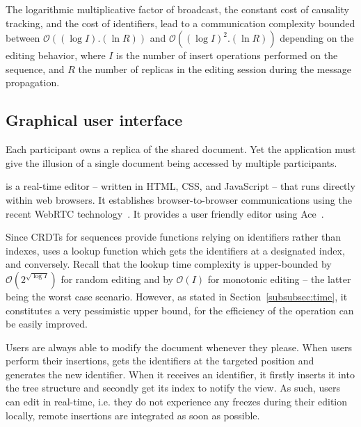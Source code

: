 The logarithmic multiplicative factor of broadcast, the constant cost of
causality tracking, and the cost of identifiers, lead to a communication
complexity bounded between $\mathcal{O}((\log I).(\ln R))$ and
$\mathcal{O}((\log I)^2.(\ln R))$ depending on the editing behavior, where $I$
is the number of insert operations performed on the sequence, and $R$ the number
of replicas in the editing session during the message propagation.

\subsection{Graphical user interface}

Each participant owns a replica of the shared document. Yet the application must
give the illusion of a single document being accessed by multiple
participants.

\CRATE is a real-time editor -- written in HTML, CSS, and JavaScript -- that
runs directly within web browsers. It establishes browser-to-browser
communications using the recent WebRTC technology~\cite{webrtc}. It provides a
user friendly editor using Ace~\cite{ace}.


Since CRDTs for sequences provide functions relying on identifiers rather than
indexes, \CRATE uses a lookup function which gets the identifiers at a
designated index, and conversely. Recall that the lookup time complexity is
upper-bounded by $\mathcal{O}(2^{\sqrt{\log I}})$ for random editing and by
$\mathcal{O}(I)$ for monotonic editing -- the latter being the worst case
scenario. However, as stated in Section~\ref{subsubsec:time}, it constitutes a
very pessimistic upper bound, for the efficiency of the operation can be easily
improved.

Users are always able to modify the document whenever they please.  When users
perform their insertions, \CRATE gets the identifiers at the targeted position
and generates the new identifier. When it receives an identifier, it firstly
inserts it into the tree structure and secondly get its index to notify the
view. As such, users can edit in real-time, i.e. they do not experience any
freezes during their edition locally, remote insertions are integrated as soon
as possible.

